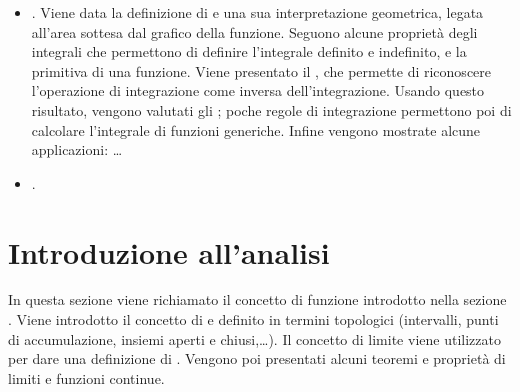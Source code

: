 \documentclass[letterpaper,10pt,english]{jupyterBook}
\begin{document}
\begin{itemize}
\item {} 
\sphinxAtStartPar
{\hyperref[\detokenize{ch/infinitesimal_calculus/integrals:infinitesimal-calculus-integrals}]{}}. Viene data la definizione di  e una sua interpretazione geometrica, legata all’area sottesa dal grafico della funzione. Seguono alcune proprietà degli integrali che permettono di definire l’integrale definito e indefinito, e la primitiva di una funzione. Viene presentato il , che permette di riconoscere l’operazione di integrazione come inversa dell’integrazione. Usando questo risultato, vengono valutati gli ; poche regole di integrazione permettono poi di calcolare l’integrale di funzioni generiche. Infine vengono mostrate alcune applicazioni: … 

\item {} 
\sphinxAtStartPar
{\hyperref[\detokenize{ch/ode:ode-hs}]{}}. 

\end{itemize}



\sphinxstepscope


\section{Introduzione all’analisi}
\label{\detokenize{ch/infinitesimal_calculus/analysis:introduzione-all-analisi}}\label{\detokenize{ch/infinitesimal_calculus/analysis:infinitesimal-calculus-analysis}}\label{\detokenize{ch/infinitesimal_calculus/analysis::doc}}
\sphinxAtStartPar
In questa sezione viene richiamato il concetto di funzione introdotto nella sezione {\hyperref[\detokenize{ch/precalculus:math-hs-precalculus}]{}}. Viene introdotto il concetto di {\hyperref[\detokenize{ch/infinitesimal_calculus/analysis:infinitesimal-calculus-limits}]{}} e definito in termini topologici (intervalli, punti di accumulazione, insiemi aperti e chiusi,…). Il concetto di limite viene utilizzato per dare una definizione di {\hyperref[\detokenize{ch/infinitesimal_calculus::doc}]{}}. Vengono poi presentati alcuni teoremi e proprietà di limiti e funzioni continue.
\end{document}

